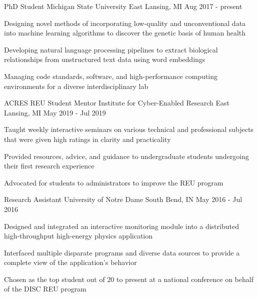 

\begin{cventries}

  \cventry
  {PhD Student} %
  {Michigan State University} %
  {East Lansing, MI} %
  {Aug 2017 - present} %
  {
    \begin{cvitems} %
      \item {Designing novel methods of incorporating low-quality and unconventional data into machine learning algorithms to discover the genetic basis of human health}
      \item {Developing natural language processing pipelines to extract biological relationships from unstructured text data using word embeddings}
      \item {Managing code standards, software, and high-performance computing environments for a diverse interdisciplinary lab}
    \end{cvitems}
  }

  \cventry
  {ACRES REU Student Mentor} %
  {Institute for Cyber-Enabled Research} %
  {East Lansing, MI} %
  {May 2019 - Jul 2019} %
  {
    \begin{cvitems} %
      \item {Taught weekly interactive seminars on various technical and professional subjects that were given high ratings in clarity and practicality}
      \item {Provided resources, advice, and guidance to undergraduate students undergoing their first research experience}
      \item {Advocated for students to administrators to improve the REU program}
    \end{cvitems}
  }

  \cventry
  {Research Assistant} %
  {University of Notre Dame} %
  {South Bend, IN} %
  {May 2016 - Jul 2016} %
  {
    \begin{cvitems} %
      \item {Designed and integrated an interactive monitoring module into a distributed high-throughput high-energy physics application}
      \item {Interfaced multiple disparate programs and diverse data sources to provide a complete view of the application's behavior}
      \item {Chosen as the top student out of 20 to present at a national conference on behalf of the DISC REU program}
    \end{cvitems}
  }


\end{cventries}
